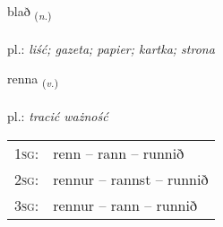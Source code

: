 \documentclass[frontgrid, backgrid]{flacards}\usepackage[]{graphicx}\usepackage[]{xcolor}
\begin{document}
\renewcommand{\flhead}{\vskip5pt \fboxsep=0pt {\small\bfseries\footnotesize Nafnorð | Noun}}
\renewcommand{\fcfoot}{\vskip5pt \fboxsep=0pt \hspace{2pt}{\small\bfseries\footnotesize 1K}}

\renewcommand{\blhead}{\vskip5pt {\small\bfseries\footnotesize Nafnorð | Noun }}
\renewcommand{\bcfoot}{\vskip5pt \hspace{2pt}{\small\bfseries\footnotesize 1K}}


{blað \small{\textsubscript{(\textit{n.})}} \\[1ex] %
\textphonetic{[plaːð]} \\
pl.: \emph{liść; gazeta; papier; kartka; strona} \\  [2ex]
\renewcommand*{\arraystretch}{0.8}
}

\renewcommand{\flhead}{\vskip5pt \fboxsep=0pt {\small\bfseries\footnotesize Sagnorð | Verb}}
\renewcommand{\fcfoot}{\vskip5pt \fboxsep=0pt \hspace{2pt}{\small\bfseries\footnotesize 1K}}

\renewcommand{\blhead}{\vskip5pt {\small\bfseries\footnotesize Sagnorð | Verb }}
\renewcommand{\bcfoot}{\vskip5pt \hspace{2pt}{\small\bfseries\footnotesize 1K}}


{renna \small{\textsubscript{(\textit{v.})}} \\[1ex] %
\textphonetic{[rɛna]} \\
pl.: \emph{tracić ważność} \\  [2ex]
\renewcommand*{\arraystretch}{0.8}
\begin{tabular}{p{1cm}l}
\textsc{1sg}: & renn -- rann -- runnið \\ 
\textsc{2sg}: & rennur -- rannst -- runnið \\ 
\textsc{3sg}: & rennur -- rann -- runnið \\ 
\end{tabular}
}
\end{document}
